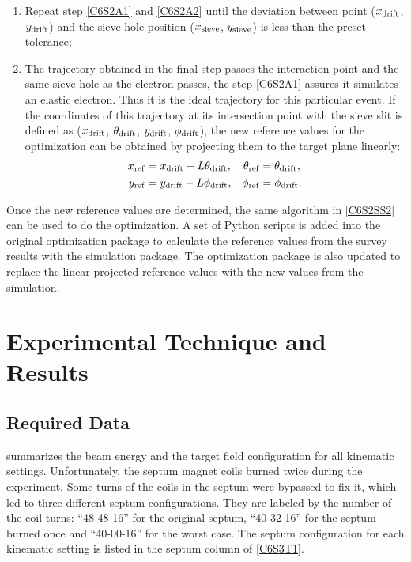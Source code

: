 \begin{enumerate}[parsep=0pt]
\item Repeat step \ref{C6S2A1} and \ref{C6S2A2} until the deviation between point ($x_{\mathrm{drift}}$, $y_{\mathrm{drift}}$) and the sieve hole position ($x_{\mathrm{sieve}}$, $y_{\mathrm{sieve}}$) is less than the preset tolerance;
\item The trajectory obtained in the final step passes the interaction point and the same sieve hole as the electron passes, the step \ref{C6S2A1} assures it simulates an elastic electron. Thus it is the ideal trajectory for this particular event. If the coordinates of this trajectory at its intersection point with the sieve slit is defined as ($x_{\mathrm{drift}}$, $\theta_{\mathrm{drift}}$, $y_{\mathrm{drift}}$, $\phi_{\mathrm{drift}}$), the new reference values for the optimization can be obtained by projecting them to the target plane linearly:
\begin{align} \label{C6S2E14}
x_{\mathrm{ref}} & = x_{\mathrm{drift}}-L\theta_{\mathrm{drift}}, & \theta_{\mathrm{ref}} & = \theta_{\mathrm{drift}}, \\ \label{C6S2E15}
y_{\mathrm{ref}} & = y_{\mathrm{drift}}-L\phi_{\mathrm{drift}}, & \phi_{\mathrm{ref}} & = \phi_{\mathrm{drift}}.
\end{align}
\end{enumerate}

Once the new reference values are determined, the same algorithm in \cref{C6S2SS2} can be used to do the optimization. A set of Python scripts is added into the original optimization package to calculate the reference values from the survey results with the simulation package. The optimization package is also updated to replace the linear-projected reference values with the new values from the simulation.

\section{Experimental Technique and Results}
\label{C6S3}

\subsection{Required Data}
\label{C6S3SS1}

 summarizes the beam energy and the target field configuration for all kinematic settings. Unfortunately, the septum magnet coils burned twice during the experiment. Some turns of the coils in the septum were bypassed to fix it, which led to three different septum configurations. They are labeled by the number of the coil turns: ``48-48-16'' for the original septum, ``40-32-16'' for the septum burned once and ``40-00-16'' for the worst case. The septum configuration for each kinematic setting is listed in the septum column of \cref{C6S3T1}.

